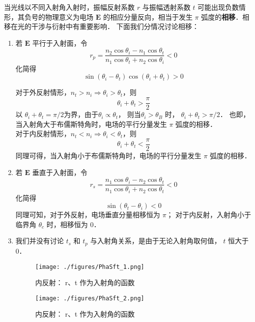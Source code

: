 
\begin{issues}
\issueMissDepend
\end{issues}


当光线以不同入射角入射时，振幅反射系数 $r$ 与振幅透射系数 $t$  可能出现负数情形，其负号的物理意义为电场 $\boldsymbol{E}$ 的相应分量反向，相当于发生 $\pi$ 弧度的\textbf{相移}．相移在光的干涉与衍射中有重要影响．
下面我们分情况讨论相移：
\begin{enumerate}
\item 若 $\boldsymbol{E}$ 平行于入射面，令
$$ r_p =  \dfrac{n_2\cos{\theta_i} - n_1\cos\theta_t}{n_1\cos\theta_t + n_2\cos\theta_i} < 0 $$
化简得
$$ \sin(\theta_i - \theta_t)\cos(\theta_i + \theta_t) > 0$$

对于外反射情形，$n_t > n_i \Rightarrow \theta_i > \theta_t$，则
$$\theta_i + \theta_t > \frac{\pi}{2}$$
以 $\theta_i + \theta_t = \pi/2$为界，由于$\theta_i \propto \theta_t$， 则当$\theta_i > \theta_B$ 时， $\theta_i + \theta_t > \pi/2$． 也即，当入射角大于布儒斯特角时，电场的平行分量发生 $\pi$ 弧度的相移．\\

对于内反射情形，$ n_t < n_i \Rightarrow \theta_i < \theta_t$，则
$$\theta_i + \theta_t < \frac{\pi}{2}$$
同理可得，当入射角小于布儒斯特角时，电场的平行分量发生 $\pi$ 弧度的相移．

\item 若 $\boldsymbol{E}$ 垂直于入射面，令
$$r_s  = \frac{n_1\cos{\theta_i} - n_2\cos\theta_t}{n_1\cos\theta_i + n_2\cos\theta_t} < 0$$
化简得
$$\sin(\theta_t - \theta_i) < 0$$
同理可知，对于外反射，电场垂直分量相移恒为 $\pi$； 对于内反射，入射角小于临界角 $\theta_c$ 时，相移恒为 0．\\

\item 我们并没有讨论 $t_s$ 和 $t_p$ 与入射角关系，是由于无论入射角取何值， $ t$ 恒大于0．

\begin{figure}[ht]
\centering
\texttt{[image: ./figures/PhaSft\_1.png]}
\caption{内反射： r、t 作为入射角的函数} \label{PhaSft_fig1}
\end{figure}

\begin{figure}[ht]
\centering
\texttt{[image: ./figures/PhaSft\_2.png]}
\caption{内反射： r、t 作为入射角的函数} \label{PhaSft_fig2}
\end{figure}


\end{enumerate}
